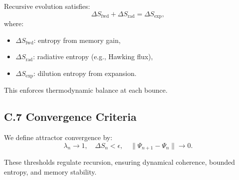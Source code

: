 Recursive evolution satisfies:
\[
\Delta S_{\text{fwd}} + \Delta S_{\text{rad}} = \Delta S_{\text{exp}},
\]
where:

\begin{itemize}[leftmargin=1.5em]
  \item \( \Delta S_{\text{fwd}} \): entropy from memory gain,
  \item \( \Delta S_{\text{rad}} \): radiative entropy (e.g., Hawking flux),
  \item \( \Delta S_{\text{exp}} \): dilution entropy from expansion.
\end{itemize}

This enforces thermodynamic balance at each bounce.

\subsection*{C.7 Convergence Criteria}

We define attractor convergence by:
\[
\lambda_n \to 1, \quad 
\Delta S_n < \epsilon, \quad 
\|\Psi_{n+1} - \Psi_n\| \to 0.
\]

These thresholds regulate recursion, ensuring dynamical coherence, bounded entropy, and memory stability.

